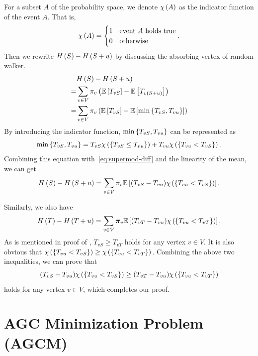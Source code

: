 \documentclass[10pt,twocolumn,twoside]{IEEEtran}
\begin{document}
\begin{IEEEproof}
    For a subset \(A\) of the probability space, we denote \(\chi\left( A \right)\) as the indicator function of the event \(A\). That is,
    \begin{equation*}
        \chi\left( A \right)=
        \begin{cases}
            1 & \text{event }A\text{ holds true} \\
            0 & \text{otherwise}
        \end{cases}.
    \end{equation*}
    Then we rewrite \(H\left(S\right)-H\left(S+u\right)\) by discussing the absorbing vertex of random walker.
    \begin{equation}\label{eq:supermod-diff}
        \begin{split}
            &H\left(S\right)-H\left(S+u\right)\\
            =&\sum_{v\in V}\pi_v\left( \mathbb{E}\left[T_{vS}\right]-\mathbb{E}\left[T_{v\left( S+u \right)}\right] \right)\\
            =&\sum_{v\in V}\pi_v\left( \mathbb{E}\left[T_{vS}\right]-\mathbb{E}\left[\min\left\{T_{vS},T_{vu} \right\}\right] \right)
        \end{split}
    \end{equation}
    By introducing the indicator function, \(\min\left\{T_{vS},T_{vu} \right\}\) can be represented as
    \begin{equation*}
        \min\left\{T_{vS},T_{vu} \right\}=T_{vS}\chi\left( \left\{T_{vS}\le T_{vu} \right\} \right)+T_{vu}\chi\left( \left\{T_{vu}<T_{vS} \right\} \right).
    \end{equation*}
    Combining this equation with~\eqref{eq:supermod-diff} and the linearity of the mean, we can get
    \begin{equation*}
        H\left(S\right)-H\left(S+u\right)=\sum_{v\in V}\pi_v\mathbb{E}\left[(T_{vS}-T_{vu})\chi\left( \left\{T_{vu}<T_{vS} \right\} \right)\right].
    \end{equation*}

    Similarly, we also have
    \[H\left(T\right)-H\left(T+u\right)=\sum_{v\in V}\boldsymbol{\pi}_v\mathbb{E}\left[(T_{vT}-T_{vu})\chi\left( \left\{T_{vu}<T_{vT} \right\} \right)\right].\]
    As is mentioned in proof of , \(T_{vS}\ge T_{vT}\) holds for any vertex \(v\in V\).
    It is also obvious that \(\chi\left( \left\{T_{vu}<T_{vS} \right\} \right)\ge\chi\left( \left\{T_{vu}<T_{vT} \right\} \right)\).
    Combining the above two inequalities, we can prove that
    \[(T_{vS}-T_{vu})\chi\left( \left\{T_{vu}<T_{vS} \right\} \right)\ge(T_{vT}-T_{vu})\chi\left( \left\{T_{vu}<T_{vT} \right\} \right)\]
    holds for any vertex \(v\in V\), which completes our proof.
\end{IEEEproof}

\section{AGC Minimization Problem (AGCM)}
\end{document}
